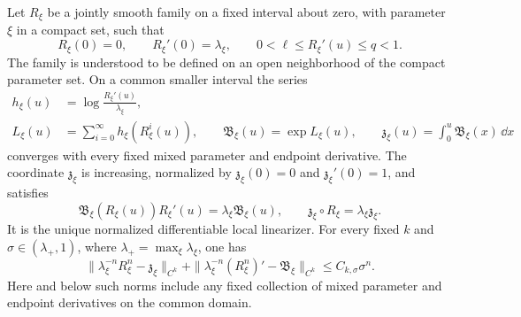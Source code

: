 \begin{lemma}
\label{lem:v15-scalar-product}
Let $R_\xi$ be a jointly smooth family on a fixed interval about zero,
with parameter $\xi$ in a compact set, such that
\[
 R_\xi(0)=0,\qquad R_\xi'(0)=\lambda_\xi,\qquad
 0<\ell\le R_\xi'(u)\le q<1.
\]
The family is understood to be defined on an open neighborhood of the
compact parameter set. On a common smaller interval the series
\begin{equation}\label{eq:v15-scalar-product}
 \begin{split}
 h_\xi(u)&=\log\frac{R_\xi'(u)}{\lambda_\xi},\\
 L_\xi(u)&=\sum_{i=0}^{\infty}h_\xi(R_\xi^i(u)),\qquad
 \mathfrak B_\xi(u)=\exp L_\xi(u),\qquad
 \mathfrak z_\xi(u)=\int_0^u\mathfrak B_\xi(x)\,\dd x
 \end{split}
\end{equation}
converges with every fixed mixed parameter and endpoint derivative.
The coordinate $\mathfrak z_\xi$ is increasing, normalized by
$\mathfrak z_\xi(0)=0$ and $\mathfrak z_\xi'(0)=1$, and satisfies
\begin{equation}\label{eq:v15-scalar-cocycle}
 \mathfrak B_\xi(R_\xi(u))R_\xi'(u)
       =\lambda_\xi\mathfrak B_\xi(u),\qquad
 \mathfrak z_\xi\circ R_\xi=\lambda_\xi\mathfrak z_\xi.
\end{equation}
It is the unique normalized differentiable local linearizer. For every
fixed $k$ and $\sigma\in(\lambda_+,1)$, where
$\lambda_+=\max_\xi\lambda_\xi$, one has
\begin{equation}\label{eq:v15-scalar-iterates}
 \|\lambda_\xi^{-n}R_\xi^n-\mathfrak z_\xi\|_{C^k}
 +\|\lambda_\xi^{-n}(R_\xi^n)'-\mathfrak B_\xi\|_{C^k}
                                      \le C_{k,\sigma}\sigma^n.
\end{equation}
Here and below such norms include any fixed collection of mixed
parameter and endpoint derivatives on the common domain.
\end{lemma}

